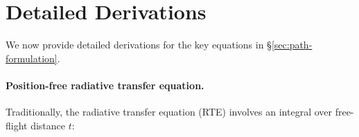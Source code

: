 \section{Detailed Derivations}
\label{sec:layeredbsdf:derivation}

We now provide detailed derivations for the key equations in \S\ref{sec:path-formulation}.

\paragraph{Position-free radiative transfer equation.}
Traditionally, the radiative transfer equation (RTE) involves an integral over free-flight distance $t$:

%
%
%
